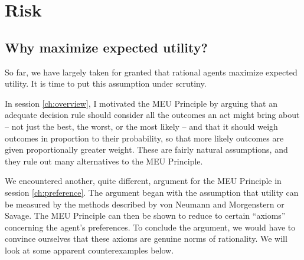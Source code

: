 \chapter{Risk}\label{ch:risk}

\section{Why maximize expected utility?}\label{sec:why-meu}

So far, we have largely taken for granted that rational agents
maximize expected utility. It is time to put this assumption under
scrutiny.

In session \ref{ch:overview}, I motivated the MEU Principle by arguing
that an adequate decision rule should consider all the outcomes an act
might bring about -- not just the best, the worst, or the most likely
-- and that it should weigh outcomes in proportion to their
probability, so that more likely outcomes are given proportionally
greater weight. These are fairly natural assumptions, and they rule
out many alternatives to the MEU Principle.

We encountered another, quite different, argument for the MEU
Principle in session \ref{ch:preference}. The argument began with the
assumption that utility can be measured by the methods described by
von Neumann and Morgenstern or Savage. The MEU Principle can then be
shown to reduce to certain ``axioms'' concerning the agent's
preferences. To conclude the argument, we would have to convince
ourselves that these axioms are genuine norms of rationality. We will
look at some apparent counterexamples below.

